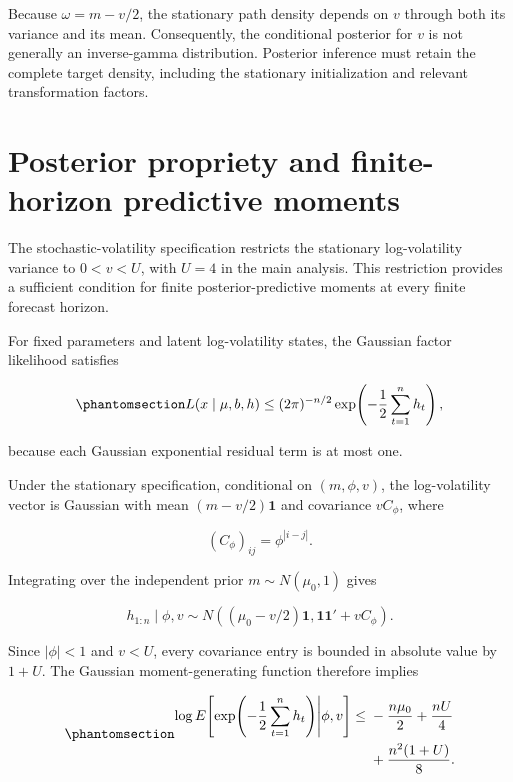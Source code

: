 \documentclass[
  12pt,
  letterpaper,
  DIV=11,
  numbers=noendperiod]{scrreprt}
\begin{document}
Because \(\omega=m-v/2\), the stationary path density depends on \(v\)
through both its variance and its mean. Consequently, the conditional
posterior for \(v\) is not generally an inverse-gamma distribution.
Posterior inference must retain the complete target density, including
the stationary initialization and relevant transformation factors.

\section{Posterior propriety and finite-horizon predictive
moments}\label{posterior-propriety-and-finite-horizon-predictive-moments}

The stochastic-volatility specification restricts the stationary
log-volatility variance to \(0<v<U\), with \(U=4\) in the main analysis.
This restriction provides a sufficient condition for finite
posterior-predictive moments at every finite forecast horizon.

For fixed parameters and latent log-volatility states, the Gaussian
factor likelihood satisfies

\begin{equation}\protect\phantomsection\label{eq-likelihood-bound}{
L(x\mid\mu,b,h)
\leq
(2\pi)^{-n/2}
\exp\!\left(
-\frac12\sum_{t=1}^{n}h_t
\right),
}\end{equation}

because each Gaussian exponential residual term is at most one.

Under the stationary specification, conditional on \((m,\phi,v)\), the
log-volatility vector is Gaussian with mean \((m-v/2)\mathbf1\) and
covariance \(vC_\phi\), where

\[
(C_\phi)_{ij}=\phi^{|i-j|}.
\]

Integrating over the independent prior \(m\sim N(\mu_0,1)\) gives

\[
h_{1:n}\mid\phi,v
\sim
N\!\left(
(\mu_0-v/2)\mathbf1,
\mathbf1\mathbf1'+vC_\phi
\right).
\]

Since \(|\phi|<1\) and \(v<U\), every covariance entry is bounded in
absolute value by \(1+U\). The Gaussian moment-generating function
therefore implies

\begin{equation}\protect\phantomsection\label{eq-normalizer-bound}{
\begin{aligned}
\log E\!\left[
\exp\!\left(-\frac12\sum_{t=1}^{n}h_t\right)
\middle|\phi,v
\right]
\leq{}&
-\frac{n\mu_0}{2}
+\frac{nU}{4}\\
&+\frac{n^2(1+U)}8.
\end{aligned}
}\end{equation}
\end{document}
